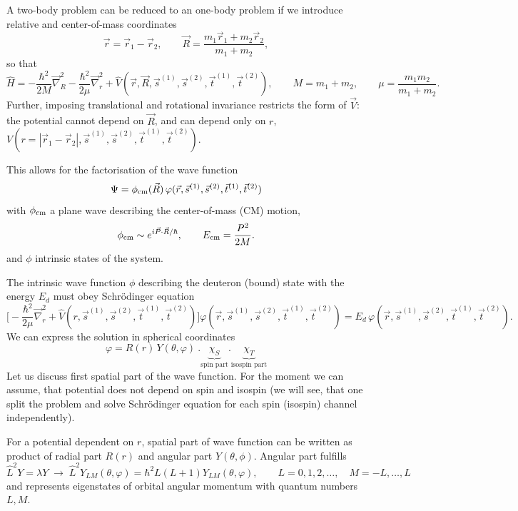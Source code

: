 \documentclass[11pt,a4paper]{article}
\newcommand{\op}[1]{\hat{#1}}
\begin{document}
A two-body problem can be reduced to an one-body problem if we introduce relative and center-of-mass coordinates
\[
\vec r=\vec r_1-\vec r_2, \qquad
\vec R=\frac{m_1\vec r_1+m_2\vec r_2}{m_1+m_2},
\]
so that
\[
\op H=-\frac{\hbar^2}{2M}\vec\nabla_R^2-\frac{\hbar^2}{2\mu}\vec\nabla_r^2
+\op V(\vec r,\vec R,\vec s^{(1)},\vec s^{(2)},\vec t^{(1)},\vec t^{(2)}),
\qquad M=m_1+m_2,\qquad \mu=\frac{m_1 m_2}{m_1+m_2}.
\]
Further, imposing translational and rotational invariance restricts the form of $\vec V$: the potential cannot depend on $\vec R$, and can depend only on $r$,
$V( r = |\vec r_1-\vec r_2|,\vec s^{(1)},\vec s^{(2)},\vec t^{(1)},\vec t^{(2)})$.

This allows for the factorisation of the wave function
\[
\Psi=\phi_{\rm cm}(\vec R)\,\varphi(\vec r,\vec s^{(1)},\vec s^{(2)},\vec t^{(1)},\vec t^{(2)})
\]
with $\phi_{\rm cm}$ a plane wave describing the center-of-mass (CM) motion,
\[
\phi_{\rm cm}\sim e^{i\vec P\cdot\vec R/\hbar},\qquad
E_{\rm cm}=\frac{P^2}{2M}.
\]
and $\phi$ intrinsic states of the system.

The intrinsic wave function $\phi$ describing  the deuteron (bound) state with the energy $E_d$ must obey Schr\"odinger equation
\begin{equation}
\nonumber
\Big[-\frac{\hbar^2}{2\mu}\vec\nabla_r^2+
\op V( r ,\vec s^{(1)},\vec s^{(2)},\vec t^{(1)},\vec t^{(2)})
\Big]
\varphi(\vec r,\vec s^{(1)},\vec s^{(2)},\vec t^{(1)},\vec t^{(2)})
=E_d\,\varphi(\vec r,\vec s^{(1)},\vec s^{(2)},\vec t^{(1)},\vec t^{(2)}).
\end{equation}
We can express the solution in spherical coordinates
\[
\varphi=R(r)\,Y(\theta,\varphi)\ . \underbrace{\chi_S}_{\text{spin part}} . \underbrace{\chi_T}_{\text{isospin part}}
\]
Let us discuss first spatial part of the wave function. For the moment we can assume, that potential does not depend on spin and isospin (we will see, that one split the problem and solve Schr\"odinger equation for each spin (isospin) channel independently). 

For a potential dependent on $r$, spatial part of wave function can be written as product of radial part $R(r)$ and angular part $Y(\theta, \phi)$. Angular part fulfills
\[
\op L^2 Y=\lambda Y \;\to\; \op L^2 Y_{LM}(\theta,\varphi)=\hbar^2 L(L+1)Y_{LM}(\theta,\varphi),
\qquad L=0,1,2,\dots,\quad M=-L,\dots,L
\]
and represents eigenstates of orbital angular momentum with quantum numbers $L,M$. 
\end{document}
